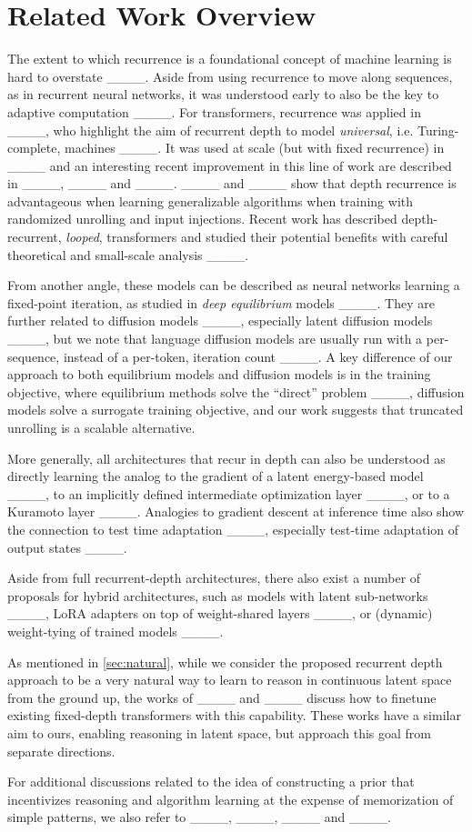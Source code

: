 \section{Related Work Overview}
The extent to which recurrence is a foundational concept of machine learning is hard to overstate ____. Aside from using recurrence to move along sequences, as in recurrent neural networks, it was understood early to also be the key to adaptive computation ____. For transformers, recurrence was applied in ____, who highlight the aim of recurrent depth to model \textit{universal}, i.e. Turing-complete, machines ____. It was used at scale (but with fixed recurrence) in ____ and an interesting recent improvement in this line of work are described in ____, ____ and ____. ____ and ____ show that depth recurrence is advantageous when learning generalizable algorithms when training with randomized unrolling and input injections. Recent work has described depth-recurrent, \textit{looped}, transformers and studied their potential benefits with careful theoretical and small-scale analysis ____.

From another angle, these models can be described as neural networks learning a fixed-point iteration, as studied in \textit{deep equilibrium} models ____. They are further related to diffusion models ____, especially latent diffusion models ____, but we note that language diffusion models are usually run with a per-sequence, instead of a per-token, iteration count ____. A key difference of our approach to both equilibrium models and diffusion models is in the training objective, where equilibrium methods solve the ``direct'' problem ____, diffusion models solve a surrogate training objective, and our work suggests that truncated unrolling is a scalable alternative.

More generally, all architectures that recur in depth can also be understood as directly learning the analog to the gradient of a latent energy-based model ____, to an implicitly defined intermediate optimization layer ____, or to a Kuramoto layer ____. Analogies to gradient descent at inference time also show the connection to test time adaptation ____, especially test-time adaptation of output states ____.

Aside from full recurrent-depth architectures, there also exist a number of proposals for hybrid architectures, such as models with latent sub-networks ____, LoRA adapters on top of weight-shared layers ____, or (dynamic) weight-tying of trained models ____. 

As mentioned in \cref{sec:natural}, while we consider the proposed recurrent depth approach to be a very natural way to learn to reason in continuous latent space from the ground up, the works of ____ and ____ discuss how to finetune existing fixed-depth transformers with this capability. These works have a similar aim to ours, enabling reasoning in latent space, but approach this goal from separate directions.

For additional discussions related to the idea of constructing a prior that incentivizes reasoning and algorithm learning at the expense of memorization of simple patterns, we also refer to ____, ____, ____ and ____.